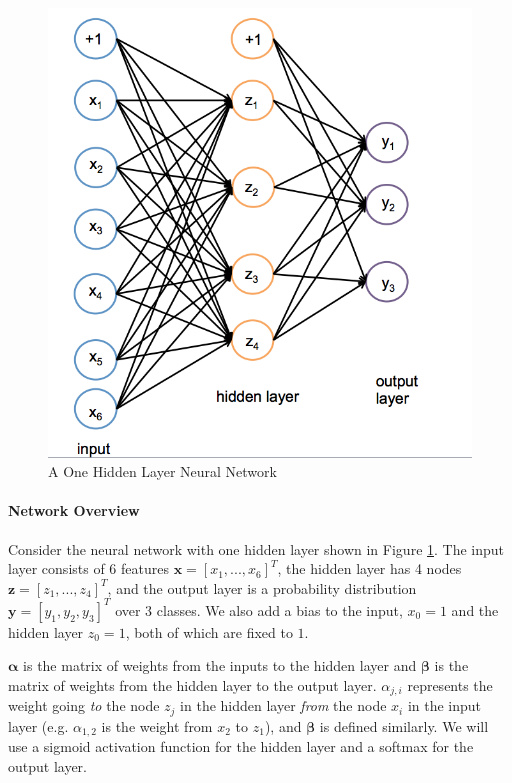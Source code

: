 \documentclass[11pt]{exam}
\numberwithin{equation}{section} %
\numberwithin{figure}{section} %
\numberwithin{table}{section} %
\newcommand{\xv}{\mathbf{x}}
\newcommand{\yv}{\mathbf{y}}
\newcommand{\zv}{\mathbf{z}}
\begin{document}
 \begin{figure}[h]
        \centering
        \includegraphics[scale=0.8]{img/oneHL6.png}
        \caption{A One Hidden Layer Neural Network}
        \label{fig:oneHL}
    \end{figure}

\paragraph{Network Overview}
Consider the neural network with one hidden layer shown in Figure \ref{fig:oneHL}. The input layer consists of 6 features $\xv = [x_1,...,x_6]^T$, the hidden layer has 4  nodes $\zv = [z_1,...,z_4]^T$, and the output layer is a probability distribution $\yv = [y_1, y_2, y_3]^T$ over 3 classes. We also add a bias to the input, $x_0 = 1$ and the hidden layer $z_0 = 1$, both of which are fixed to $1$.

$\boldsymbol{\alpha}$ is the matrix of weights from the inputs to the hidden layer and $\boldsymbol{\beta}$ is the matrix of weights from the hidden layer to the output layer. 
$\alpha_{j,i}$ represents the weight going \textit{to} the node $z_j$ in the hidden layer \textit{from} the node $x_i$ in the input layer (e.g. $\alpha_{1,2}$ is the weight from $x_2$ to $z_1$), and $\boldsymbol{\beta}$ is defined similarly. We will use a sigmoid activation function for the hidden layer and a softmax for the output layer. 
\end{document}
